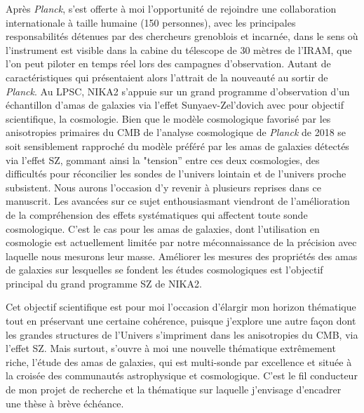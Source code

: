\documentclass[a4paper, 11pt]{report}
\begin{document}
Après \emph{Planck}, s'est offerte à moi l'opportunité de rejoindre une
collaboration internationale à taille humaine (150 personnes), avec
les principales responsabilités détenues par des chercheurs grenoblois
et incarnée, dans le sens où l'instrument est visible dans la cabine
du télescope de 30 mètres de l'IRAM, que l'on peut piloter en temps
réel lors des campagnes d'observation. Autant de caractéristiques qui
présentaient alors l'attrait de la nouveauté au sortir de \emph{Planck}. Au
LPSC, NIKA2 s'appuie sur un grand programme d'observation d'un
échantillon d'amas de galaxies via l'effet Sunyaev-Zel'dovich avec pour
objectif scientifique, la cosmologie. Bien que le modèle cosmologique
favorisé par les anisotropies primaires du CMB de l'analyse cosmologique de \emph{Planck} de 2018 se
soit sensiblement rapproché du modèle préféré par les amas de galaxies
détectés via l'effet SZ, gommant ainsi la "tension'' entre ces deux
cosmologies, des difficultés pour réconcilier les sondes de l'univers
lointain et de l'univers proche subsistent. Nous aurons l'occasion d'y
revenir à plusieurs reprises dans ce manuscrit. Les avancées sur ce sujet
enthousiasmant viendront de l'amélioration de la compréhension des
effets systématiques qui affectent toute sonde cosmologique. C'est le
cas pour les amas de galaxies, dont l'utilisation en cosmologie est
actuellement limitée par notre méconnaissance de la précision avec
laquelle nous mesurons leur masse. Améliorer les mesures des
propriétés des amas de galaxies sur lesquelles se fondent les études
cosmologiques est l'objectif principal du grand programme SZ de NIKA2. 

Cet objectif scientifique est pour moi l'occasion d'élargir mon
horizon thématique tout en préservant une certaine cohérence, puisque
j'explore une autre façon dont les grandes structures de l'Univers
s'impriment dans les anisotropies du CMB, via l'effet SZ. Mais
surtout, s'ouvre à moi une nouvelle thématique extrêmement riche,
l'étude des amas de galaxies, qui est multi-sonde par excellence et
située à la croisée des communautés astrophysique et
cosmologique. C'est le fil conducteur de mon projet de recherche et la
thématique sur laquelle j'envisage d'encadrer une thèse à brève
échéance.
\end{document}
